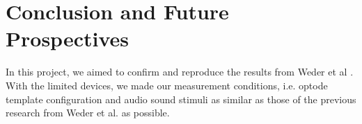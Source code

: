 \chapter{Conclusion and Future Prospectives}
In this project, we aimed to confirm and reproduce the results from Weder et al \cite{Weder2018}. With the limited devices, we made our measurement conditions, i.e. optode template configuration and audio sound stimuli as similar as those of the previous research from Weder et al. \cite{Weder2018} as possible.